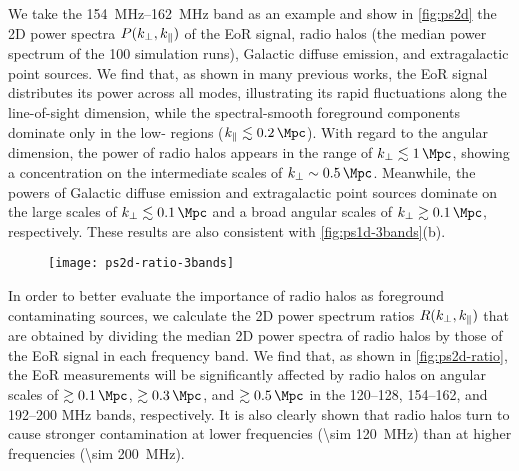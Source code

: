 We take the \SIrange{154}{162}{\MHz} band as an example and show in
\autoref{fig:ps2d} the 2D power spectra $P(k_{\perp}, k_{\parallel})$ of the EoR
signal, radio halos (the median power spectrum of the 100 simulation runs),
Galactic diffuse emission, and extragalactic point sources.
We find that, as shown in many previous works,
the EoR signal distributes its power across all \klos{} modes,
illustrating its rapid fluctuations along the line-of-sight dimension,
while the spectral-smooth foreground components dominate only in the
low-\klos{} regions ($\klos{} \lesssim \SI{0.2}{\per\Mpc}$).
With regard to the angular dimension, the power of radio halos appears in
the range of $\kperp \lesssim \SI{1}{\per\Mpc}$, showing a concentration
on the intermediate scales of $\kperp \sim \SI{0.5}{\per\Mpc}$.
Meanwhile, the powers of Galactic diffuse emission and extragalactic
point sources dominate on the large scales of
$\kperp \lesssim \SI{0.1}{\per\Mpc}$ and a broad angular scales of
$\kperp \gtrsim \SI{0.1}{\per\Mpc}$, respectively.
These results are also consistent with \autoref{fig:ps1d-3bands}(b).

\begin{figure}[htp]
  \centering
  \texttt{[image: ps2d-ratio-3bands]}
  \label{fig:ps2d-ratio}
\end{figure}

In order to better evaluate the importance of radio halos as foreground
contaminating sources, we calculate the 2D power spectrum ratios
$R(k_{\perp}, k_{\parallel})$ that are obtained by dividing the median 2D power
spectra of radio halos by those of the EoR signal in each frequency band.
We find that, as shown in \autoref{fig:ps2d-ratio}, the EoR measurements
will be significantly affected by radio halos on angular scales of
$\gtrsim \SI{0.1}{\per\Mpc}$, $\gtrsim \SI{0.3}{\per\Mpc}$, and
$\gtrsim \SI{0.5}{\per\Mpc}$ in the \numrange{120}{128},
\numrange{154}{162}, and \numrange{192}{200} \si{\MHz} bands, respectively.
It is also clearly shown that radio halos turn to cause stronger
contamination at lower frequencies (\SI{\sim 120}{\MHz}) than at higher
frequencies (\SI{\sim 200}{\MHz}).

